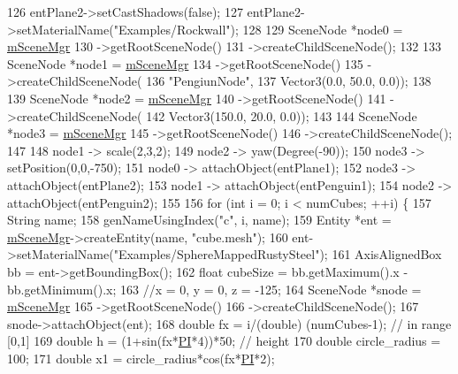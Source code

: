 \begin{DoxyCode}
126     entPlane2->setCastShadows(\textcolor{keyword}{false});
127     entPlane2->setMaterialName(\textcolor{stringliteral}{"Examples/Rockwall"});
128 
129     SceneNode *node0 = \hyperlink{class_base_application_a8a7684f4f9a57ed3089048ad1a913b2d}{mSceneMgr}
130         ->getRootSceneNode()
131         ->createChildSceneNode();
132 
133     SceneNode *node1 = \hyperlink{class_base_application_a8a7684f4f9a57ed3089048ad1a913b2d}{mSceneMgr}
134         ->getRootSceneNode()
135         ->createChildSceneNode(
136             \textcolor{stringliteral}{"PengiunNode"},
137             Vector3(0.0, 50.0, 0.0));
138 
139     SceneNode *node2 = \hyperlink{class_base_application_a8a7684f4f9a57ed3089048ad1a913b2d}{mSceneMgr}
140         ->getRootSceneNode()
141         ->createChildSceneNode(
142             Vector3(150.0, 20.0, 0.0));
143 
144      SceneNode *node3 = \hyperlink{class_base_application_a8a7684f4f9a57ed3089048ad1a913b2d}{mSceneMgr}
145         ->getRootSceneNode()
146         ->createChildSceneNode();
147 
148     node1 -> scale(2,3,2);
149     node2 -> yaw(Degree(-90));
150     node3 -> setPosition(0,0,-750);
151     node0 -> attachObject(entPlane1);
152     node3 -> attachObject(entPlane2);
153     node1 -> attachObject(entPenguin1);
154     node2 -> attachObject(entPenguin2);
155 
156     \textcolor{keywordflow}{for} (\textcolor{keywordtype}{int} i = 0; i < numCubes; ++i) \{
157         String name;
158         genNameUsingIndex(\textcolor{stringliteral}{"c"}, i, name);
159         Entity *ent = \hyperlink{class_base_application_a8a7684f4f9a57ed3089048ad1a913b2d}{mSceneMgr}->createEntity(name, \textcolor{stringliteral}{"cube.mesh"});
160         ent->setMaterialName(\textcolor{stringliteral}{"Examples/SphereMappedRustySteel"});
161         AxisAlignedBox bb = ent->getBoundingBox();
162         \textcolor{keywordtype}{float} cubeSize = bb.getMaximum().x - bb.getMinimum().x;
163         \textcolor{comment}{//x = 0, y = 0, z = -125;}
164         SceneNode *snode = \hyperlink{class_base_application_a8a7684f4f9a57ed3089048ad1a913b2d}{mSceneMgr}
165         ->getRootSceneNode()
166         ->createChildSceneNode();
167         snode->attachObject(ent);
168         \textcolor{keywordtype}{double} fx = i/(double) (numCubes-1); \textcolor{comment}{// in range [0,1]}
169         \textcolor{keywordtype}{double} h = (1+sin(fx*\hyperlink{_tutorial_application_8cpp_aa08a577393243b86dfd2a97e61443673}{PI}*4))*50; \textcolor{comment}{// height}
170         \textcolor{keywordtype}{double} circle\_radius = 100;
171         \textcolor{keywordtype}{double} x1 = circle\_radius*cos(fx*\hyperlink{_tutorial_application_8cpp_aa08a577393243b86dfd2a97e61443673}{PI}*2);

\end{DoxyCode}
